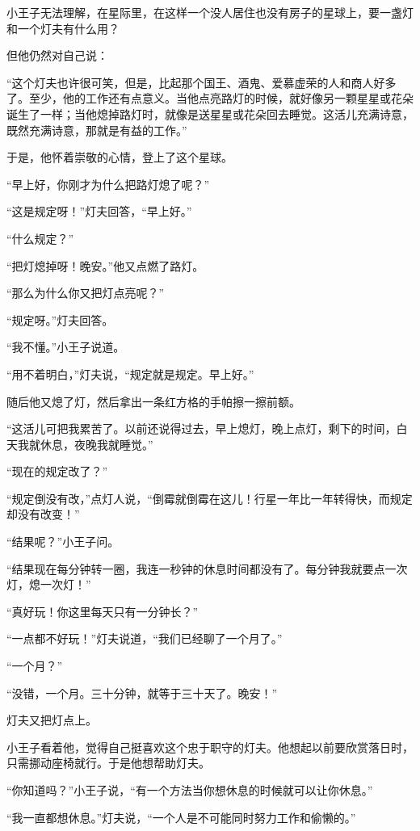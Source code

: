 小王子无法理解，在星际里，在这样一个没人居住也没有房子的星球上，要一盏灯和一个灯夫有什么用？

但他仍然对自己说：

“这个灯夫也许很可笑，但是，比起那个国王、酒鬼、爱慕虚荣的人和商人好多了。至少，他的工作还有点意义。当他点亮路灯的时候，就好像另一颗星星或花朵诞生了一样；当他熄掉路灯时，就像是送星星或花朵回去睡觉。这活儿充满诗意，既然充满诗意，那就是有益的工作。”

于是，他怀着崇敬的心情，登上了这个星球。

“早上好，你刚才为什么把路灯熄了呢？”

“这是规定呀！”灯夫回答，“早上好。”

“什么规定？”

“把灯熄掉呀！晚安。”他又点燃了路灯。

“那么为什么你又把灯点亮呢？”

“规定呀。”灯夫回答。

“我不懂。”小王子说道。

“用不着明白，”灯夫说，“规定就是规定。早上好。”

随后他又熄了灯，然后拿出一条红方格的手帕擦一擦前额。

“这活儿可把我累苦了。以前还说得过去，早上熄灯，晚上点灯，剩下的时间，白天我就休息，夜晚我就睡觉。”

“现在的规定改了？”

“规定倒没有改，”点灯人说，“倒霉就倒霉在这儿！行星一年比一年转得快，而规定却没有改变！”

“结果呢？”小王子问。

“结果现在每分钟转一圈，我连一秒钟的休息时间都没有了。每分钟我就要点一次灯，熄一次灯！”

{\startalignment[center]
 \stopalignment}

“真好玩！你这里每天只有一分钟长？”

“一点都不好玩！”灯夫说道，“我们已经聊了一个月了。”

“一个月？”

“没错，一个月。三十分钟，就等于三十天了。晚安！”

灯夫又把灯点上。

小王子看着他，觉得自己挺喜欢这个忠于职守的灯夫。他想起以前要欣赏落日时，只需挪动座椅就行。于是他想帮助灯夫。

“你知道吗？”小王子说，“有一个方法当你想休息的时候就可以让你休息。”

“我一直都想休息。”灯夫说，“一个人是不可能同时努力工作和偷懒的。”

